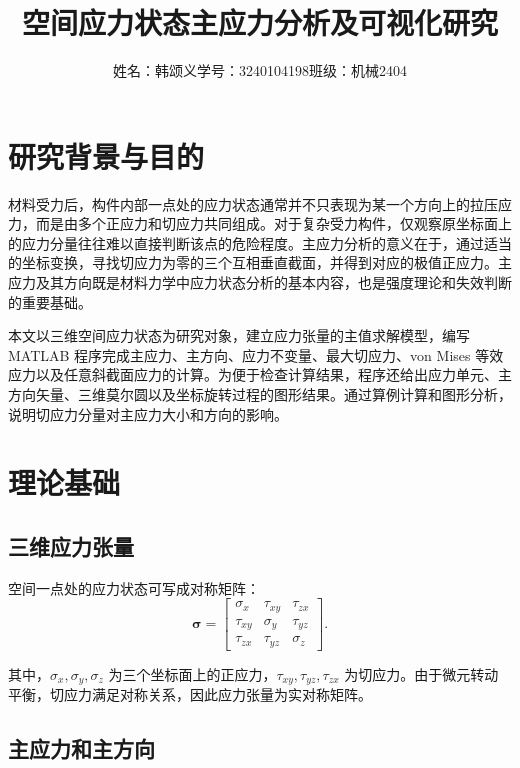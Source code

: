 \documentclass[UTF8,a4paper,12pt]{ctexart}
\title{\heiti 空间应力状态主应力分析及可视化研究}
\author{姓名：韩颂义\quad 学号：3240104198\quad 班级：机械2404}
\date{}
\newcommand{\stress}{\bm{\sigma}}
\begin{document}
\maketitle
\tableofcontents
\newpage

\section{研究背景与目的}

材料受力后，构件内部一点处的应力状态通常并不只表现为某一个方向上的拉压应力，而是由多个正应力和切应力共同组成。对于复杂受力构件，仅观察原坐标面上的应力分量往往难以直接判断该点的危险程度。主应力分析的意义在于，通过适当的坐标变换，寻找切应力为零的三个互相垂直截面，并得到对应的极值正应力。主应力及其方向既是材料力学中应力状态分析的基本内容，也是强度理论和失效判断的重要基础。

本文以三维空间应力状态为研究对象，建立应力张量的主值求解模型，编写 MATLAB 程序完成主应力、主方向、应力不变量、最大切应力、von Mises 等效应力以及任意斜截面应力的计算。为便于检查计算结果，程序还给出应力单元、主方向矢量、三维莫尔圆以及坐标旋转过程的图形结果。通过算例计算和图形分析，说明切应力分量对主应力大小和方向的影响。

\section{理论基础}

\subsection{三维应力张量}

空间一点处的应力状态可写成对称矩阵：
\begin{equation}
\stress =
\begin{bmatrix}
\sigma_x & \tau_{xy} & \tau_{zx} \\
\tau_{xy} & \sigma_y & \tau_{yz} \\
\tau_{zx} & \tau_{yz} & \sigma_z
\end{bmatrix}.
\end{equation}

其中，$\sigma_x,\sigma_y,\sigma_z$ 为三个坐标面上的正应力，$\tau_{xy},\tau_{yz},\tau_{zx}$ 为切应力。由于微元转动平衡，切应力满足对称关系，因此应力张量为实对称矩阵。

\subsection{主应力和主方向}
\end{document}

